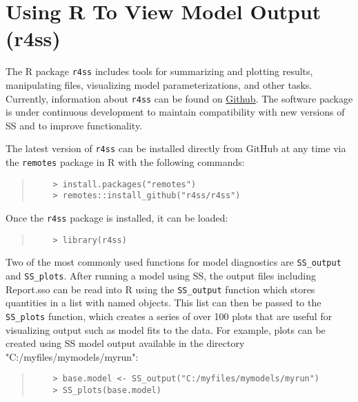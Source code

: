 
\section{Using R To View Model Output (r4ss)}\label{r4ss}

The R package \texttt{r4ss} includes tools for summarizing and plotting results, manipulating files, visualizing model parameterizations, and other tasks. Currently, information about \texttt{r4ss} can be found on \href{https://github.com/r4ss/r4ss}{Github}.  The software package is under continuous development to maintain compatibility with new versions of SS and to improve functionality.

The latest version of \texttt{r4ss} can be installed directly from GitHub at any time via the \texttt{remotes} package in R with the following commands:

\begin{quote}
	\begin{verbatim}
	> install.packages("remotes")
	> remotes::install_github("r4ss/r4ss")
	\end{verbatim}
\end{quote}

Once the \texttt{r4ss} package is installed, it can be loaded:

\begin{quote}
	\begin{verbatim}
	> library(r4ss)
	\end{verbatim}
\end{quote}

Two of the most commonly used functions for model diagnostics are \texttt{SS\_output} and \texttt{SS\_plots}. After running a model using SS, the output files including Report.sso can be read into R using the \texttt{SS\_output} function which stores quantities in a list with named objects.  This list can then be passed to the \texttt{SS\_plots} function, which creates a series of over 100 plots that are useful for visualizing output such as model fits to the data. For example, plots can be created using SS model output available in the directory "C:/myfiles/mymodels/myrun":

\begin{quote}
	\begin{verbatim}
	> base.model <- SS_output("C:/myfiles/mymodels/myrun")
	> SS_plots(base.model)
	\end{verbatim}
\end{quote}
  
